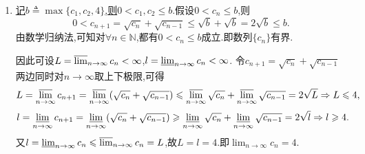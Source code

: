 \documentclass[../../main.tex]{subfiles}
\begin{document}
\begin{solution}
\begin{enumerate}
\item \hyperref[example3.23-1]{记\(b\triangleq\max\{c_1,c_2,4\}\),则\(0 < c_1,c_2\le b\)}.假设\(0 < c_n\le b\),则
\[
0 < c_{n + 1}=\sqrt{c_n}+\sqrt{c_{n - 1}}\leqslant\sqrt{b}+\sqrt{b}=2\sqrt{b}\leqslant b.
\]
由数学归纳法,可知对\(\forall n\in\mathbb{N}\),都有\(0 < c_n\le b\)成立.即数列\(\{c_n\}\)有界.

因此可设\(L=\varlimsup_{n\rightarrow\infty}c_n <\infty\),\(l=\varliminf_{n\rightarrow\infty}c_n <\infty\).
令\(c_{n + 1}=\sqrt{c_n}+\sqrt{c_{n - 1}}\)两边同时对\(n\rightarrow\infty\)取上下极限,可得
\[
L=\varlimsup_{n\rightarrow\infty}c_{n + 1}=\varlimsup_{n\rightarrow\infty}(\sqrt{c_n}+\sqrt{c_{n - 1}})\leqslant\varlimsup_{n\rightarrow\infty}\sqrt{c_n}+\varlimsup_{n\rightarrow\infty}\sqrt{c_{n - 1}}=2\sqrt{L}\Rightarrow L\leqslant 4,
\]
\[
l=\varliminf_{n\rightarrow\infty}c_{n + 1}=\varliminf_{n\rightarrow\infty}(\sqrt{c_n}+\sqrt{c_{n - 1}})\geqslant\varliminf_{n\rightarrow\infty}\sqrt{c_n}+\varliminf_{n\rightarrow\infty}\sqrt{c_{n - 1}}=2\sqrt{l}\Rightarrow l\geqslant 4.
\]
又\(l=\varliminf_{n\rightarrow\infty}c_n\leqslant\varlimsup_{n\rightarrow\infty}c_n = L\),故\(L = l = 4\).即\(\lim_{n\rightarrow\infty}c_n = 4\).


\end{enumerate}
\end{solution}
\end{document}
